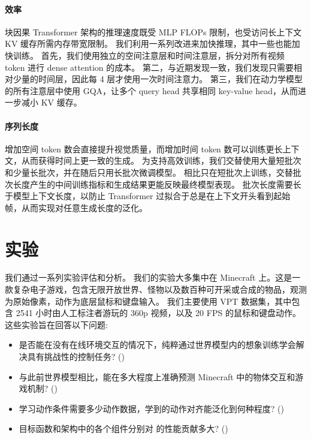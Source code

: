 \documentclass[11pt]{article}
\begin{document}
\paragraph{效率}

块因果 Transformer 架构的推理速度既受 MLP FLOPs 限制，也受访问长上下文 KV 缓存所需内存带宽限制。
我们利用一系列改进来加快推理，其中一些也能加快训练。
首先，我们使用独立的空间注意层和时间注意层，拆分对所有视频 token 进行 dense attention 的成本\citep{axial}。
第二，与近期发现一致\citep{llama4}，我们发现只需要相对少量的时间层，因此每 4 层才使用一次时间注意力。
第三，我们在动力学模型的所有注意层中使用 GQA\citep{gqa}，让多个 query head 共享相同 key-value head，从而进一步减小 KV 缓存。

\paragraph{序列长度}

增加空间 token 数会直接提升视觉质量，而增加时间 token 数可以训练更长上下文，从而获得时间上更一致的生成。
为支持高效训练，我们交替使用大量短批次和少量长批次，并在随后只用长批次微调模型。
相比只在短批次上训练，交替批次长度产生的中间训练指标和生成结果更能反映最终模型表现。
批次长度需要长于模型上下文长度，以防止 Transformer 过拟合于总是在上下文开头看到起始帧，从而实现对任意生成长度的泛化。

\pagebreak
\section{实验}



我们通过一系列实验评估和分析\method。
我们的实验大多集中在 Minecraft 上。这是一款复杂电子游戏，包含无限开放世界、怪物以及数百种可开采或合成的物品，观测为原始像素，动作为底层鼠标和键盘输入。
我们主要使用 VPT 数据集\citep{vpt}，其中包含 2541 小时由人工标注者游玩的 360p 视频，以及 20 FPS 的鼠标和键盘动作。
这些实验旨在回答以下问题:

\begin{itemize}
\item \method 是否能在没有在线环境交互的情况下，纯粹通过世界模型内的想象训练学会解决具有挑战性的控制任务? ()
\item 与此前世界模型相比，\method 能在多大程度上准确预测 Minecraft 中的物体交互和游戏机制? ()
\item \method 学习动作条件需要多少动作数据，学到的动作对齐能泛化到何种程度? ()
\item 目标函数和架构中的各个组件分别对 \method 的性能贡献多大? ()
\end{itemize}
\end{document}
